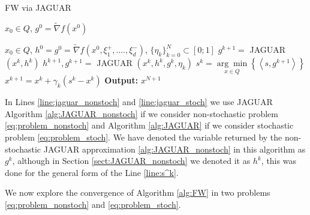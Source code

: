         \begin{algorithm}[H]
    	\caption{FW via JAGUAR}
    	\label{alg:FW}
        	\begin{algorithmic}[1]
        		 $x_0 \in Q$, $g^0 = \widetilde\nabla f(x^0)$

                 $x_0 \in Q$, $h^0 = g^0 = \widetilde\nabla f(x^0, \xi_1^+, ...., \xi_d^-)$, $\{\eta_k\}_{k=0}^N \subset [0; 1]$
                    \State $g^{k+1} = $ JAGUAR $\left( x^k, h^k \right)$ \label{line:jaguar_nonstoch}
                    \State $h^{k+1}, g^{k+1} = $ JAGUAR $\left( x^k, h^k, g^k, \eta_k \right)$ \label{line:jaguar_stoch}
                    \State $s^k = \underset{x \in Q}{\arg\min}\left\{\left<s, g^{k+1} \right> \right\}$ \label{line:s^k}
                    \State $x^{k+1} = x^k + \gamma_k (s^k - x^k)$ \label{line:x^k}
                \EndFor
            \State \textbf{Output:} $x^{N+1}$ 
        	\end{algorithmic}
        \end{algorithm}
    

        In Lines \ref{line:jaguar_nonstoch} and \ref{line:jaguar_stoch}  we use JAGUAR Algorithm \ref{alg:JAGUAR_nonstoch} if we consider non-stochastic problem \eqref{eq:problem_nonstoch} and Algorithm \ref{alg:JAGUAR} if we consider stochastic problem \eqref{eq:problem_stoch}. We have denoted the variable returned by the non-stochastic JAGUAR approximation \ref{alg:JAGUAR_nonstoch} in this algorithm as $g^k$, although in Section \ref{sect:JAGUAR_nonstoch} we denoted it as $h^k$, this was done for the general form of the Line \ref{line:s^k}. 
    
        We now explore the convergence of Algorithm \ref{alg:FW} in two problems \eqref{eq:problem_nonstoch} and \eqref{eq:problem_stoch}.

